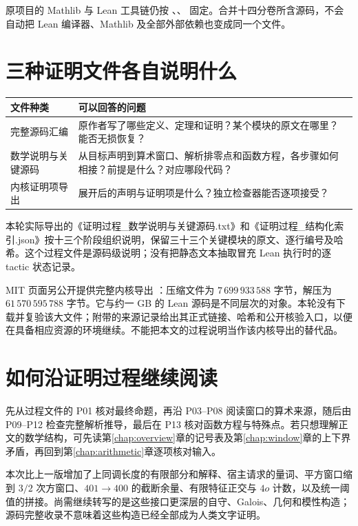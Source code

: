 \documentclass[UTF8,fontset=fandol,a4paper,openany,oneside]{ctexbook}
\theoremstyle{definition}
\theoremstyle{remark}
\begin{document}
原项目的 Mathlib 与 Lean 工具链仍按 、、 固定。合并十四分卷所含源码，不会自动把 Lean 编译器、Mathlib 及全部外部依赖也变成同一个文件。

\clearpage
\section{三种证明文件各自说明什么}
\begin{longtable}{@{}p{}p{}@{}}
\toprule
文件种类 & 可以回答的问题\\
\midrule
\endhead
完整源码汇编 & 原作者写了哪些定义、定理和证明？某个模块的原文在哪里？能否无损恢复？\\
数学说明与关键源码 & 从目标声明到算术窗口、解析排零点和函数方程，各步骤如何相接？前提是什么？对应哪段代码？\\
内核证明项导出 & 展开后的声明与证明项是什么？独立检查器能否逐项接受？\\
\bottomrule
\end{longtable}

本轮实际导出的《证明过程\_数学说明与关键源码.txt》和《证明过程\_结构化索引.json》按十三个阶段组织说明，保留三十三个关键模块的原文、逐行编号及哈希。这个过程文件是源码级说明；没有把静态文本抽取冒充 Lean 执行时的逐 tactic 状态记录。

MIT 页面另公开提供完整内核导出 ：压缩文件为 $7\,699\,933\,588$ 字节，解压为 $61\,570\,595\,788$ 字节。它与约一 GB 的 Lean 源码是不同层次的对象。本轮没有下载并复验该大文件；附带的来源记录给出其正式链接、哈希和公开核验入口，以便在具备相应资源的环境继续。不能把本文的过程说明当作该内核导出的替代品。

\section{如何沿证明过程继续阅读}
先从过程文件的 P01 核对最终命题，再沿 P03--P08 阅读窗口的算术来源，随后由 P09--P12 检查完整解析推导，最后在 P13 核对函数方程与特殊点。若只想理解正文的数学结构，可先读第\ref{chap:overview}章的记号表及第\ref{chap:window}章的上下界矛盾，再回到第\ref{chap:arithmetic}章逐项核对输入。

本次比上一版增加了上同调长度的有限部分和解释、宿主请求的量词、平方窗口缩到 $3/2$ 次方窗口、$401\to400$ 的截断余量、有限特征正交与 $4o$ 计数，以及统一阈值的拼接。尚需继续转写的是这些接口更深层的自守、Galois、几何和模性构造；源码完整收录不意味着这些构造已经全部成为人类文字证明。
\end{document}

